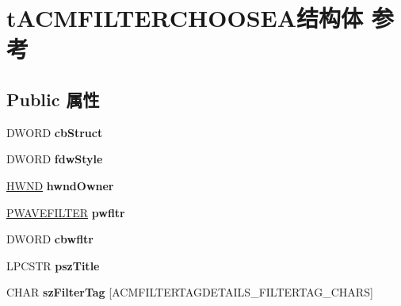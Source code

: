 \hypertarget{structt_a_c_m_f_i_l_t_e_r_c_h_o_o_s_e_a}{}\section{t\+A\+C\+M\+F\+I\+L\+T\+E\+R\+C\+H\+O\+O\+S\+E\+A结构体 参考}
\label{structt_a_c_m_f_i_l_t_e_r_c_h_o_o_s_e_a}
\subsection*{Public 属性}
\begin{DoxyCompactItemize}
\item 
\mbox{\label{structt_a_c_m_f_i_l_t_e_r_c_h_o_o_s_e_a_a4afe12fd5359043aaa000356cf4a1f61}} 
D\+W\+O\+RD {\bfseries cb\+Struct}
\item 
\mbox{\label{structt_a_c_m_f_i_l_t_e_r_c_h_o_o_s_e_a_a50e72868d8c504895508d757d6478446}} 
D\+W\+O\+RD {\bfseries fdw\+Style}
\item 
\mbox{\label{structt_a_c_m_f_i_l_t_e_r_c_h_o_o_s_e_a_af9d1ddb811f3fbeaeb571a43a437f83d}} 
\hyperlink{interfacevoid}{H\+W\+ND} {\bfseries hwnd\+Owner}
\item 
\mbox{\label{structt_a_c_m_f_i_l_t_e_r_c_h_o_o_s_e_a_a7dc7a4da4dcbd70de5f6e37eaf25a3e7}} 
\hyperlink{struct___w_a_v_e_f_i_l_t_e_r}{P\+W\+A\+V\+E\+F\+I\+L\+T\+ER} {\bfseries pwfltr}
\item 
\mbox{\label{structt_a_c_m_f_i_l_t_e_r_c_h_o_o_s_e_a_a384a175af208550ef3e8959d5b63afc8}} 
D\+W\+O\+RD {\bfseries cbwfltr}
\item 
\mbox{\label{structt_a_c_m_f_i_l_t_e_r_c_h_o_o_s_e_a_a8ab661166cff09da7200d3fe3db7968b}} 
L\+P\+C\+S\+TR {\bfseries psz\+Title}
\item 
\mbox{\label{structt_a_c_m_f_i_l_t_e_r_c_h_o_o_s_e_a_abd8e14d52af123cdb824e79b2c8b9aea}} 
C\+H\+AR {\bfseries sz\+Filter\+Tag} \mbox{[}A\+C\+M\+F\+I\+L\+T\+E\+R\+T\+A\+G\+D\+E\+T\+A\+I\+L\+S\+\_\+\+F\+I\+L\+T\+E\+R\+T\+A\+G\+\_\+\+C\+H\+A\+RS\mbox{]}

\end{DoxyCompactItemize}
